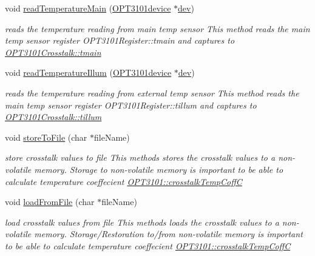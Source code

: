 \begin{DoxyCompactItemize}
void \mbox{\hyperlink{class_o_p_t3101_crosstalk_a2cae9662362161eb9a3d0e324b7513c3}{read\+Temperature\+Main}} (\mbox{\hyperlink{class_o_p_t3101device}{O\+P\+T3101device}} $\ast$\mbox{\hyperlink{main_8cpp_ab300459c1e7c2edd49f4b7b1a120dd26}{dev}})
\begin{DoxyCompactList}\small\item\em reads the temperature reading from main temp sensor This method reads the main temp sensor register O\+P\+T3101\+Register\+::tmain and captures to \mbox{\hyperlink{class_o_p_t3101_crosstalk_af5ac7c2a662a32e1ad954412a3c8d6ea}{O\+P\+T3101\+Crosstalk\+::tmain}} \end{DoxyCompactList}\item 
void \mbox{\hyperlink{class_o_p_t3101_crosstalk_a4fa60e996e6b3a74387e7d20179ca899}{read\+Temperature\+Illum}} (\mbox{\hyperlink{class_o_p_t3101device}{O\+P\+T3101device}} $\ast$\mbox{\hyperlink{main_8cpp_ab300459c1e7c2edd49f4b7b1a120dd26}{dev}})
\begin{DoxyCompactList}\small\item\em reads the temperature reading from external temp sensor This method reads the main temp sensor register O\+P\+T3101\+Register\+::tillum and captures to \mbox{\hyperlink{class_o_p_t3101_crosstalk_a88191108ac32b8cc9a25309ff5beae08}{O\+P\+T3101\+Crosstalk\+::tillum}} \end{DoxyCompactList}\item 
void \mbox{\hyperlink{class_o_p_t3101_crosstalk_abbfaa9d700ec5bac95dd88316b1dafe0}{store\+To\+File}} (char $\ast$file\+Name)
\begin{DoxyCompactList}\small\item\em store crosstalk values to file This methods stores the crosstalk values to a non-\/volatile memory. Storage to non-\/volatile memory is important to be able to calculate temperature coeffecient \mbox{\hyperlink{class_o_p_t3101_1_1crosstalk_temp_coff_c}{O\+P\+T3101\+::crosstalk\+Temp\+CoffC}} \end{DoxyCompactList}\item 
void \mbox{\hyperlink{class_o_p_t3101_crosstalk_a6646bcfb7cc1de3a3952ff7368f168ba}{load\+From\+File}} (char $\ast$file\+Name)
\begin{DoxyCompactList}\small\item\em load crosstalk values from file This methods loads the crosstalk values to a non-\/volatile memory. Storage/\+Restoration to/from non-\/volatile memory is important to be able to calculate temperature coeffecient \mbox{\hyperlink{class_o_p_t3101_1_1crosstalk_temp_coff_c}{O\+P\+T3101\+::crosstalk\+Temp\+CoffC}} \end{DoxyCompactList}\item 

\end{DoxyCompactItemize}
